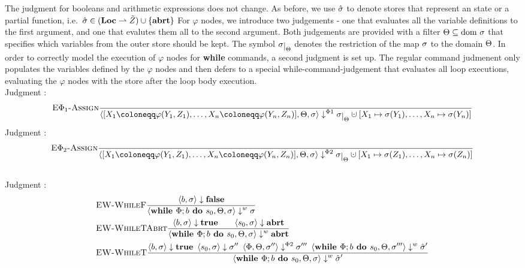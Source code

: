 The judgment for booleans and arithmetic expressions does not change.
As before, we use $\hat{\sigma}{}$ to denote stores that represent an \exception{}
state or a partial function, i.e.\ $\hat{\sigma}{} \in (\textbf{Loc} \rightharpoonup \tilde{Z}) \cup \{\textbf{abrt}\}$
For $\varphi$ nodes, we introduce two judgements - one that evaluates all the variable definitions
to the first argument, and one that evalutes them all to the second argument.
Both judgements are provided with a filter $\Theta \subseteq \text{dom }{\sigma}$ that specifies which variables 
from the outer store should be kept.
The symbol $\store\restrict{\filter}$ denotes the restriction of the map $\sigma$
to the domain $\Theta$.
In order to correctly model the execution of $\varphi$ nodes for \textbf{while} commands,
a second judgment is set up.
The regular command judmenent only populates the variables defined by the $\varphi$ nodes
and then defers to a special while-command-judgement that evaluates all loop executions,
evaluating the $\varphi$ nodes with the store after the loop body execution.
\\
Judgment :
\begin{align*}
    &\bsrule{E$\Phi_1$-Assign}{}
    {\bigsteppl{\defaultphilistn}{\filter}{\store}{\storeassign{\store\restrict{\filter}}{X_1 \mapsto \store(Y_1),\ldots, X_n \mapsto \store(Y_n)}}}\\
\end{align*}
Judgment :
\begin{align*}
    &\bsrule{E$\Phi_2$-Assign}{}
    {\bigsteppr{\defaultphilistn}{\filter}{\store}{\storeassign{\store\restrict{\filter}}{X_1 \mapsto \store(Z_1),\ldots, X_n \mapsto \store(Z_n)}}}\\
\end{align*}
\\
Judgment :
\begin{align*}
    &\textsc{EW-WhileF}\frac{\displaystyle \langle b, \sigma \rangle \downarrow \textbf{false}}{\displaystyle \langle \textbf{while }\Phi;{b} \textbf{ do } {s_0}, \Theta, \sigma \rangle \downarrow^w \sigma}\qquad\\
    &\textsc{EW-WhileTAbrt}\frac{\displaystyle \langle b, \sigma \rangle \downarrow \textbf{true} \qquad 
    \langle s_0, \sigma \rangle \downarrow \textbf{abrt}}{\displaystyle \langle \textbf{while }\Phi;{b} \textbf{ do } {s_0}, \Theta, \sigma \rangle \downarrow^w \textbf{abrt}}\\
    &\textsc{EW-WhileT}\frac{\displaystyle \langle b, \sigma \rangle \downarrow \textbf{true} \enskip
    \langle s_0, \sigma \rangle \downarrow \sigma'' \enskip
    \langle \Phi, \Theta, \sigma'' \rangle \downarrow^{\Phi2} \sigma''' \enskip
    \langle \textbf{while }\Phi;{b} \textbf{ do } {s_0}, \Theta, \sigma''' \rangle \downarrow^w \hat{\sigma}'}{\displaystyle \langle \textbf{while }\Phi;{b} \textbf{ do } {s_0}, \Theta, \sigma \rangle \downarrow^w \hat{\sigma}'}
\end{align*}
